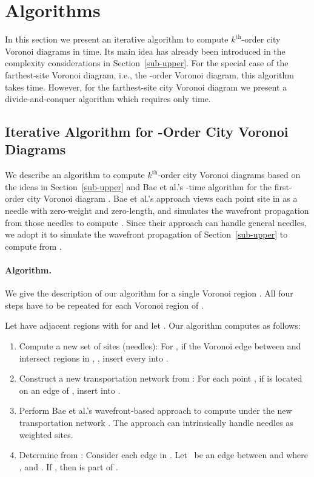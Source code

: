 \documentclass[11pt]{llncs}
\newcommand{\kth}{\ensuremath{k^{\mathrm{th}}}\xspace}
\newcommand{\kthorder}{\kth-order\xspace}
\begin{document}
\section{Algorithms}
\label{sec-algorithms}

In this section we present an iterative algorithm to compute \kthorder city Voronoi diagrams in
 time. Its main idea has already been introduced in the complexity considerations in Section~\ref{sub-upper}.
For the special case of the
farthest-site Voronoi diagram, i.e., the -order Voronoi diagram,
this algorithm takes  time. However, for the farthest-site city Voronoi diagram we present a divide-and-conquer algorithm which requires only  time.


\subsection{Iterative Algorithm for -Order City Voronoi Diagrams}

We describe an algorithm to compute \kthorder city Voronoi diagrams  based on
the ideas in Section~\ref{sub-upper} and
Bae et al.'s \cite{BKC-09} -time
algorithm for the first-order city Voronoi diagram .
Bae et al.'s approach views each point site in  as a needle with zero-weight and zero-length,
and simulates the wavefront propagation from those needles to compute .
Since their approach can handle general needles,
we adopt it to simulate the wavefront propagation of Section~\ref{sub-upper} to compute  from .



\paragraph{Algorithm.}
We give the description of our algorithm for a single Voronoi region .
All four steps have to be repeated for each Voronoi region of .

Let  have  adjacent regions  with  for 
and let .
Our algorithm computes  as follows:
\begin{enumerate}
  \item Compute a new set  of sites (needles):
        For , if the Voronoi edge between  and  intersect  regions  in , , insert every  into .
  \item Construct a new transportation network  from :
        For each point ,
        if  is located on an edge  of , insert  into .
  \item Perform Bae et al.'s wavefront-based approach
         to compute  under the new transportation network .
         The approach can intrinsically handle needles as weighted sites.
  \item Determine  from :
		Consider each edge  in .
        Let~ be an edge between  and 
        where ,  and .
        If , then  is part of .
\end{enumerate}
\end{document}
